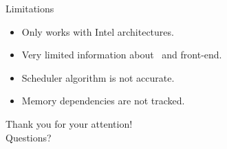 \documentclass[10pt, tikz,border=2mm, xcolor=dvipsnames]{beamer}
\begin{document}
\begin{frame}{Limitations}

\begin{itemize}[<+- | alert@+>]
    \item Only works with Intel architectures.
    \item Very limited information about \microops\ and front-end.
    \item Scheduler algorithm is not accurate.
    \item Memory dependencies are not tracked.
\end{itemize}
\end{frame}

{
    \begin{frame}[standout]
    Thank you for your attention!\\
    Questions?
\end{frame}
}
\end{document}
